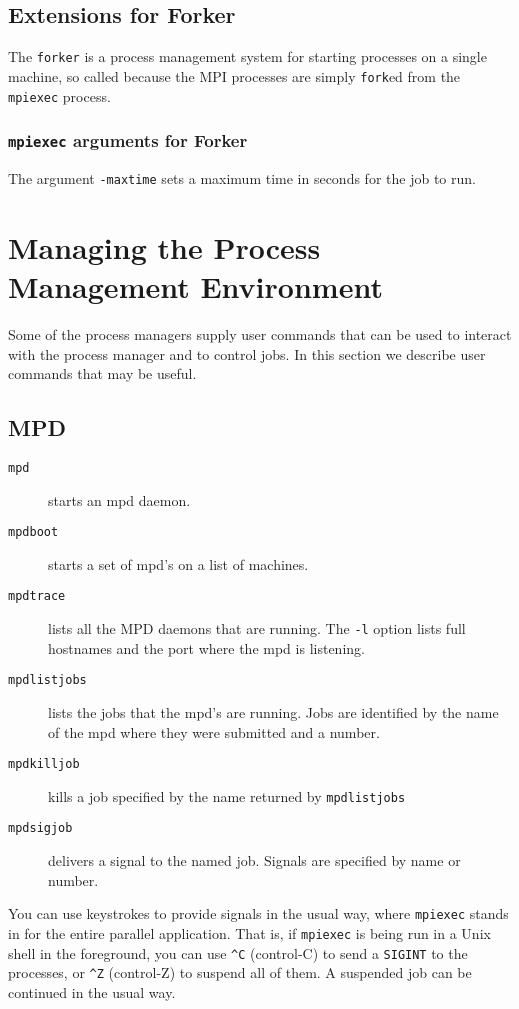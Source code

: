 \documentclass[dvipdfm,11pt]{article}
\begin{document}
\subsection{Extensions for Forker}
\label{sec:extensions-forker}
The \texttt{forker} is a process management system for starting
processes on a single machine, so called because the MPI processes are
simply \texttt{fork}ed from the \texttt{mpiexec} process.

\subsubsection{\texttt{mpiexec} arguments for Forker}
\label{sec:mpiexec-forker}

The argument \texttt{-maxtime} sets a maximum time in seconds for the
job to run.


\section{Managing the Process Management Environment}
\label{sec:managing-pme}

Some of the process managers supply user commands that can be used to
interact with the process manager and to control jobs.  In this section
we describe user commands that may be useful.

\subsection{MPD}
\label{sec:managing-mpd}

\begin{description}
\item[\texttt{mpd}]  starts an mpd daemon.
\item[\texttt{mpdboot}] starts a set of mpd's on a list of machines.
\item[\texttt{mpdtrace}] lists all the MPD daemons that are running.  The
  \texttt{-l} option lists full hostnames and the port where the mpd is
  listening.
\item[\texttt{mpdlistjobs}] lists the jobs that the mpd's are running.
  Jobs are identified by the name of the mpd where they were submitted
  and a number.
\item[\texttt{mpdkilljob}] kills a job specified by the name returned by
  \texttt{mpdlistjobs }
\item[\texttt{mpdsigjob}] delivers a signal to the named job.  Signals
  are specified by name or number.
\end{description}
You can use keystrokes to provide signals in the usual way, where
\texttt{mpiexec} stands in for the entire parallel application.  That
is, if \texttt{mpiexec} is being run in a Unix shell in the foreground,
you can use \verb+^C+ (control-C) to send a \texttt{SIGINT} to the
processes, or \verb+^Z+ (control-Z) to suspend all of them.  A suspended
job can be continued in the usual way.
\end{document}
